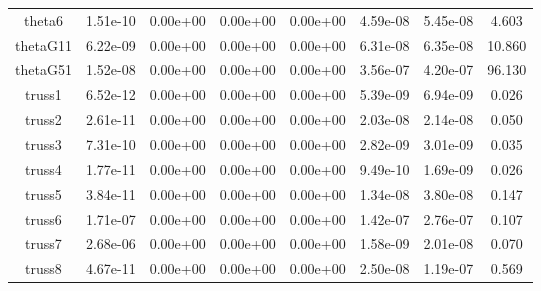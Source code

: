 {{\begin{table}[h]
\begin{center}
{\begin{tabular}{cccccccc}
              theta6 & 1.51e-10 & 0.00e+00 & 0.00e+00 & 0.00e+00 & 4.59e-08 & 5.45e-08 & 4.603 \\ 
            thetaG11 & 6.22e-09 & 0.00e+00 & 0.00e+00 & 0.00e+00 & 6.31e-08 & 6.35e-08 & 10.860 \\ 
            thetaG51 & 1.52e-08 & 0.00e+00 & 0.00e+00 & 0.00e+00 & 3.56e-07 & 4.20e-07 & 96.130 \\ 
              truss1 & 6.52e-12 & 0.00e+00 & 0.00e+00 & 0.00e+00 & 5.39e-09 & 6.94e-09 & 0.026 \\ 
              truss2 & 2.61e-11 & 0.00e+00 & 0.00e+00 & 0.00e+00 & 2.03e-08 & 2.14e-08 & 0.050 \\ 
              truss3 & 7.31e-10 & 0.00e+00 & 0.00e+00 & 0.00e+00 & 2.82e-09 & 3.01e-09 & 0.035 \\ 
              truss4 & 1.77e-11 & 0.00e+00 & 0.00e+00 & 0.00e+00 & 9.49e-10 & 1.69e-09 & 0.026 \\ 
              truss5 & 3.84e-11 & 0.00e+00 & 0.00e+00 & 0.00e+00 & 1.34e-08 & 3.80e-08 & 0.147 \\ 
              truss6 & 1.71e-07 & 0.00e+00 & 0.00e+00 & 0.00e+00 & 1.42e-07 & 2.76e-07 & 0.107 \\ 
              truss7 & 2.68e-06 & 0.00e+00 & 0.00e+00 & 0.00e+00 & 1.58e-09 & 2.01e-08 & 0.070 \\ 
              truss8 & 4.67e-11 & 0.00e+00 & 0.00e+00 & 0.00e+00 & 2.50e-08 & 1.19e-07 & 0.569 \\ 
      \bottomrule
    \end{tabular}
  }  
\end{center}  
\end{table}}}

